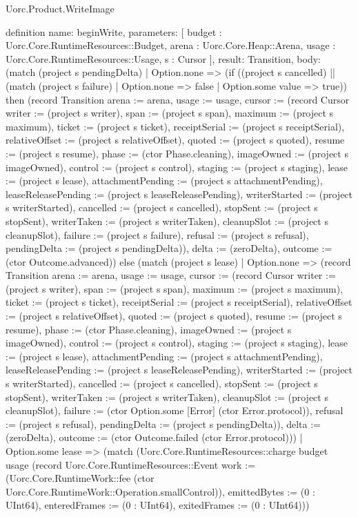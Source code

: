 \begin{lexlean}{Uorc.Product.WriteImage}
\begin{semanticmodule}
definition{
  name: beginWrite,
  parameters: [
    budget : Uorc.Core.RuntimeResources::Budget,
    arena : Uorc.Core.Heap::Arena,
    usage : Uorc.Core.RuntimeResources::Usage,
    s : Cursor
  ],
  result: Transition,
  body: (match (project s pendingDelta)
    | Option.none => (if ((project s cancelled) || (match (project s failure)
      | Option.none => false
      | Option.some value => true)) then (record Transition {arena := arena, usage := usage, cursor := (record Cursor {writer := (project s writer), span := (project s span), maximum := (project s maximum), ticket := (project s ticket), receiptSerial := (project s receiptSerial), relativeOffset := (project s relativeOffset), quoted := (project s quoted), resume := (project s resume), phase := (ctor Phase.cleaning), imageOwned := (project s imageOwned), control := (project s control), staging := (project s staging), lease := (project s lease), attachmentPending := (project s attachmentPending), leaseReleasePending := (project s leaseReleasePending), writerStarted := (project s writerStarted), cancelled := (project s cancelled), stopSent := (project s stopSent), writerTaken := (project s writerTaken), cleanupSlot := (project s cleanupSlot), failure := (project s failure), refusal := (project s refusal), pendingDelta := (project s pendingDelta)}), delta := (zeroDelta), outcome := (ctor Outcome.advanced)}) else (match (project s lease)
      | Option.none => (record Transition {arena := arena, usage := usage, cursor := (record Cursor {writer := (project s writer), span := (project s span), maximum := (project s maximum), ticket := (project s ticket), receiptSerial := (project s receiptSerial), relativeOffset := (project s relativeOffset), quoted := (project s quoted), resume := (project s resume), phase := (ctor Phase.cleaning), imageOwned := (project s imageOwned), control := (project s control), staging := (project s staging), lease := (project s lease), attachmentPending := (project s attachmentPending), leaseReleasePending := (project s leaseReleasePending), writerStarted := (project s writerStarted), cancelled := (project s cancelled), stopSent := (project s stopSent), writerTaken := (project s writerTaken), cleanupSlot := (project s cleanupSlot), failure := (ctor Option.some [Error] (ctor Error.protocol)), refusal := (project s refusal), pendingDelta := (project s pendingDelta)}), delta := (zeroDelta), outcome := (ctor Outcome.failed (ctor Error.protocol))})
      | Option.some lease => (match (Uorc.Core.RuntimeResources::charge budget usage (record Uorc.Core.RuntimeResources::Event {work := (Uorc.Core.RuntimeWork::fee (ctor Uorc.Core.RuntimeWork::Operation.smallControl)), emittedBytes := (0 : UInt64), enteredFrames := (0 : UInt64), exitedFrames := (0 : UInt64)}))
}
\end{semanticmodule}
\end{lexlean}
